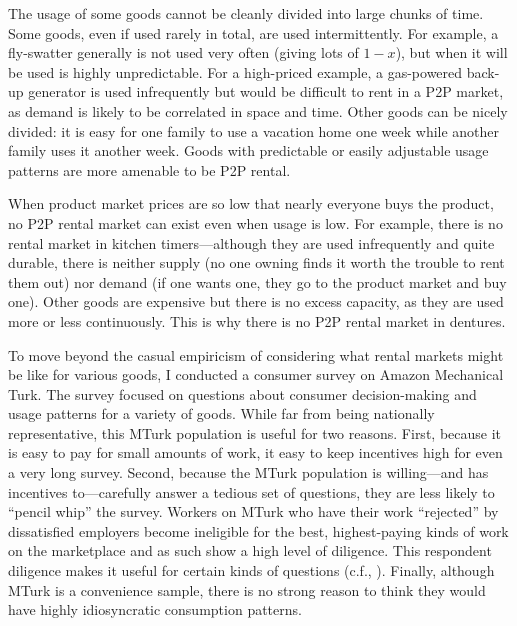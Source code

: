 \documentclass[11pt]{article}
\begin{document}
The usage of some goods cannot be cleanly divided into large chunks of time.  
Some goods, even if used rarely in total, are used intermittently. 
For example, a fly-swatter generally is not used very often (giving lots of $1-x$), but when it will be used is highly unpredictable. 
For a high-priced example, a gas-powered back-up generator is used infrequently but would be difficult to rent in a P2P market, as demand is likely to be correlated in space and time. 
Other goods can be nicely divided: it is easy for one family to use a vacation home one week while another family uses it another week. 
Goods with predictable or easily adjustable usage patterns are more amenable to be P2P rental. 

When product market prices are so low that nearly everyone buys the product, no P2P rental market can exist even when usage is low.  
For example, there is no rental market in kitchen timers---although they are used infrequently and quite durable, there is neither supply (no one owning finds it worth the trouble to rent them out) nor demand (if one wants one, they go to the product market and buy one). 
Other goods are expensive but there is no excess capacity, as they are used more or less continuously. 
This is why there is no P2P rental market in dentures. 

To move beyond the casual empiricism of considering what rental markets might be like for various goods, I conducted a consumer survey on Amazon Mechanical Turk. 
The survey focused on questions about consumer decision-making and usage patterns for a variety of goods. 
While far from being nationally representative, this MTurk population is useful for two reasons. 
First, because it is easy to pay for small amounts of work, it easy to keep incentives high for even a very long survey. 
Second, because the MTurk population is willing---and has incentives to---carefully answer a tedious set of questions, they are less likely to ``pencil whip'' the survey. 
Workers on MTurk who have their work ``rejected'' by dissatisfied employers become ineligible for the best, highest-paying kinds of work on the marketplace and as such show a high level of diligence.    
This respondent diligence makes it useful for certain kinds of questions (c.f., \cite{kuziemko2013elastic}).  
Finally, although MTurk is a convenience sample, there is no strong reason to think they would have highly idiosyncratic consumption patterns. 
\end{document}

